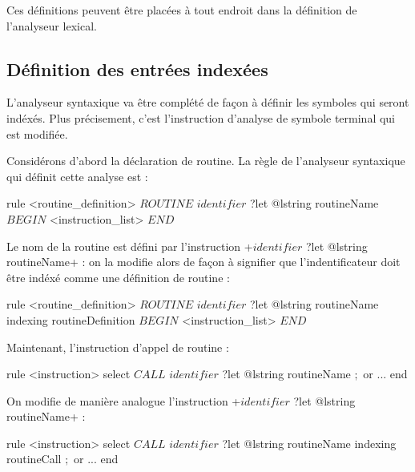 \begin{galgas}
lexique logo_lexique indexing in "INDEXING" {
  ...
indexing routineDefinition : "Routine Definition"
  ...
indexing routineCall : "Routine call"
  ...
\end{galgas}


Ces définitions peuvent être placées à tout endroit dans la définition de l'analyseur lexical.








\subsection{Définition des entrées indexées}

L'analyseur syntaxique va être complété de façon à définir les symboles qui seront indéxés. Plus précisement, c'est l'instruction d'analyse de symbole terminal qui est modifiée.

Considérons d'abord la déclaration de routine. La règle de l'analyseur syntaxique qui définit cette analyse est :

\begin{galgas}
rule <routine_definition> {
  $ROUTINE$
  $identifier$ ?let @lstring routineName
  $BEGIN$
  <instruction_list>
  $END$
}
\end{galgas}

Le nom de la routine est défini par l'instruction \ggs+$identifier$ ?let @lstring routineName+ : on la modifie alors de façon à signifier que l'indentificateur doit être indéxé comme une définition de routine :

\begin{galgas}
rule <routine_definition> {
  $ROUTINE$
  $identifier$ ?let @lstring routineName indexing routineDefinition
  $BEGIN$
  <instruction_list>
  $END$
}
\end{galgas}

Maintenant, l'instruction d'appel de routine :

\begin{galgas}
rule <instruction> {
  select
    $CALL$
    $identifier$ ?let @lstring routineName
    $;$
  or
    ...
  end
}
\end{galgas}

On modifie de manière analogue l'instruction \ggs+$identifier$ ?let @lstring routineName+ :

\begin{galgas}
rule <instruction> {
  select
    $CALL$
    $identifier$ ?let @lstring routineName indexing routineCall
    $;$
  or
    ...
  end
}
\end{galgas}



